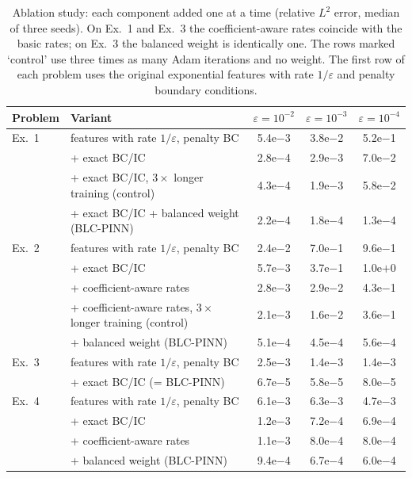 \begin{table}[!htb]
\centering\footnotesize
\setlength{\tabcolsep}{4pt}
\caption{Ablation study: each component added one at a time (relative $L^2$ error, median of three seeds). On Ex.~1 and Ex.~3 the coefficient-aware rates coincide with the basic rates; on Ex.~3 the balanced weight is identically one. The rows marked `control' use three times as many Adam iterations and no weight. The first row of each problem uses the original exponential features with rate $1/\varepsilon$ and penalty boundary conditions.}
\label{tab:ablation}
\begin{tabular}{l>{\raggedright\arraybackslash}p{}ccc}
\toprule
Problem & Variant & $\varepsilon=10^{-2}$ & $\varepsilon=10^{-3}$ & $\varepsilon=10^{-4}$ \\
\midrule
Ex.~1 & features with rate $1/\varepsilon$, penalty BC & 5.4e$-$3 & 3.8e$-$2 & 5.2e$-$1 \\
 & + exact BC/IC & 2.8e$-$4 & 2.9e$-$3 & 7.0e$-$2 \\
 & + exact BC/IC, $3\times$ longer training (control) & 4.3e$-$4 & 1.9e$-$3 & 5.8e$-$2 \\
 & + exact BC/IC + balanced weight (BLC-PINN) & 2.2e$-$4 & 1.8e$-$4 & 1.3e$-$4 \\
\addlinespace
Ex.~2 & features with rate $1/\varepsilon$, penalty BC & 2.4e$-$2 & 7.0e$-$1 & 9.6e$-$1 \\
 & + exact BC/IC & 5.7e$-$3 & 3.7e$-$1 & 1.0e$+$0 \\
 & + coefficient-aware rates & 2.8e$-$3 & 2.9e$-$2 & 4.3e$-$1 \\
 & + coefficient-aware rates, $3\times$ longer training (control) & 2.1e$-$3 & 1.6e$-$2 & 3.6e$-$1 \\
 & + balanced weight (BLC-PINN) & 5.1e$-$4 & 4.5e$-$4 & 5.6e$-$4 \\
\addlinespace
Ex.~3 & features with rate $1/\varepsilon$, penalty BC & 2.5e$-$3 & 1.4e$-$3 & 1.4e$-$3 \\
 & + exact BC/IC (= BLC-PINN) & 6.7e$-$5 & 5.8e$-$5 & 8.0e$-$5 \\
\addlinespace
Ex.~4 & features with rate $1/\varepsilon$, penalty BC & 6.1e$-$3 & 6.3e$-$3 & 4.7e$-$3 \\
 & + exact BC/IC & 1.2e$-$3 & 7.2e$-$4 & 6.9e$-$4 \\
 & + coefficient-aware rates & 1.1e$-$3 & 8.0e$-$4 & 8.0e$-$4 \\
 & + balanced weight (BLC-PINN) & 9.4e$-$4 & 6.7e$-$4 & 6.0e$-$4 \\
\bottomrule
\end{tabular}
\end{table}
